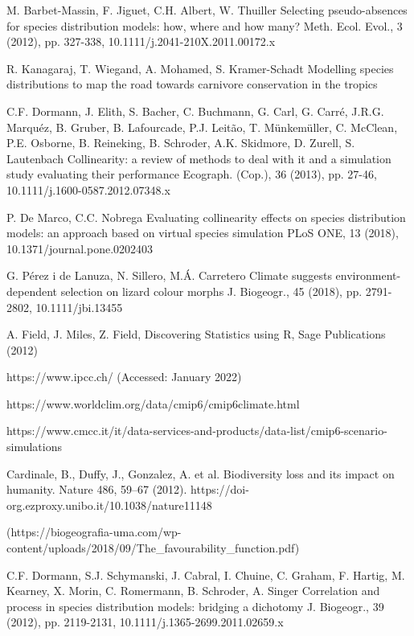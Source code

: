 \documentclass[12pt,a4paper]{article}
\begin{document}
\begin{thebibliography}{999}
M. Barbet-Massin, F. Jiguet, C.H. Albert, W. Thuiller
Selecting pseudo-absences for species distribution models: how, where and how many?
Meth. Ecol. Evol., 3 (2012), pp. 327-338, 10.1111/j.2041-210X.2011.00172.x

R. Kanagaraj, T. Wiegand, A. Mohamed, S. Kramer-Schadt
Modelling species distributions to map the road towards carnivore conservation in the tropics

C.F. Dormann, J. Elith, S. Bacher, C. Buchmann, G. Carl, G. Carré, J.R.G. Marquéz, B. Gruber, B. Lafourcade, P.J. Leitão, T. Münkemüller, C. McClean, P.E. Osborne, B. Reineking, B. Schroder, A.K. Skidmore, D. Zurell, S. Lautenbach
Collinearity: a review of methods to deal with it and a simulation study evaluating their performance
Ecograph. (Cop.), 36 (2013), pp. 27-46, 10.1111/j.1600-0587.2012.07348.x

P. De Marco, C.C. Nobrega
Evaluating collinearity effects on species distribution models: an approach based on virtual species simulation
PLoS ONE, 13 (2018), 10.1371/journal.pone.0202403

G. Pérez i de Lanuza, N. Sillero, M.Á. Carretero
Climate suggests environment-dependent selection on lizard colour morphs
J. Biogeogr., 45 (2018), pp. 2791-2802, 10.1111/jbi.13455

A. Field, J. Miles, Z. Field, Discovering Statistics using R, Sage Publications (2012)

https://www.ipcc.ch/ (Accessed: January 2022)

https://www.worldclim.org/data/cmip6/cmip6climate.html

https://www.cmcc.it/it/data-services-and-products/data-list/cmip6-scenario-simulations

Cardinale, B., Duffy, J., Gonzalez, A. et al. Biodiversity loss and its impact on humanity. Nature 486, 59–67 (2012). https://doi-org.ezproxy.unibo.it/10.1038/nature11148

(https://biogeografia-uma.com/wp-content/uploads/2018/09/The\_favourability\_function.pdf)

C.F. Dormann, S.J. Schymanski, J. Cabral, I. Chuine, C. Graham, F. Hartig, M. Kearney, X. Morin, C. Romermann, B. Schroder, A. Singer
Correlation and process in species distribution models: bridging a dichotomy
J. Biogeogr., 39 (2012), pp. 2119-2131, 10.1111/j.1365-2699.2011.02659.x


\end{thebibliography}
\end{document}
